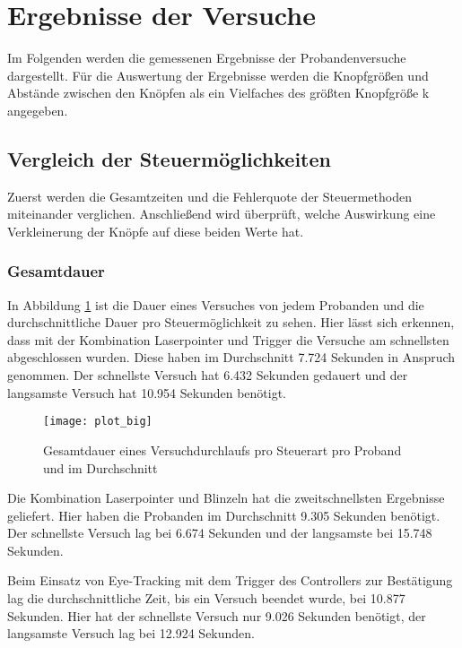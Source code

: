 \section{Ergebnisse der Versuche}
Im Folgenden werden die gemessenen Ergebnisse der Probandenversuche dargestellt. 
Für die Auswertung der Ergebnisse werden die Knopfgrößen und Abstände zwischen den Knöpfen als ein Vielfaches des größten Knopfgröße k angegeben. 
\subsection{Vergleich der Steuermöglichkeiten}
Zuerst werden die Gesamtzeiten und die Fehlerquote der Steuermethoden miteinander verglichen. Anschließend wird überprüft, welche Auswirkung eine Verkleinerung der Knöpfe auf diese beiden Werte hat. 
\subsubsection{Gesamtdauer}
In Abbildung \ref{fig:totalTimesBig} ist die Dauer eines Versuches von jedem Probanden und die durchschnittliche Dauer pro Steuermöglichkeit zu sehen. Hier lässt sich erkennen, dass mit der Kombination Laserpointer und Trigger die Versuche am schnellsten abgeschlossen wurden. Diese haben im Durchschnitt 7.724 Sekunden in Anspruch genommen. Der schnellste Versuch hat 6.432 Sekunden gedauert und der langsamste Versuch hat 10.954 Sekunden benötigt.

\begin{figure}[!htbp]
	\centering
	\texttt{[image: plot\_big]}
	\caption[Gesamtdauer eines Versuchdurchlaufs pro Steuerart pro Proband und im Durchschnitt]{Gesamtdauer eines Versuchdurchlaufs pro Steuerart pro Proband und im Durchschnitt}
	\label{fig:totalTimesBig}
\end{figure}

Die Kombination Laserpointer und Blinzeln hat die zweitschnellsten Ergebnisse geliefert. Hier haben die Probanden im Durchschnitt 9.305 Sekunden benötigt. Der schnellste Versuch lag bei 6.674 Sekunden und der langsamste bei 15.748 Sekunden. 

Beim Einsatz von Eye-Tracking mit dem Trigger des Controllers zur Bestätigung lag die durchschnittliche Zeit, bis ein Versuch beendet wurde, bei 10.877 Sekunden. Hier hat der schnellste Versuch nur 9.026 Sekunden benötigt, der langsamste Versuch lag bei 12.924 Sekunden.

